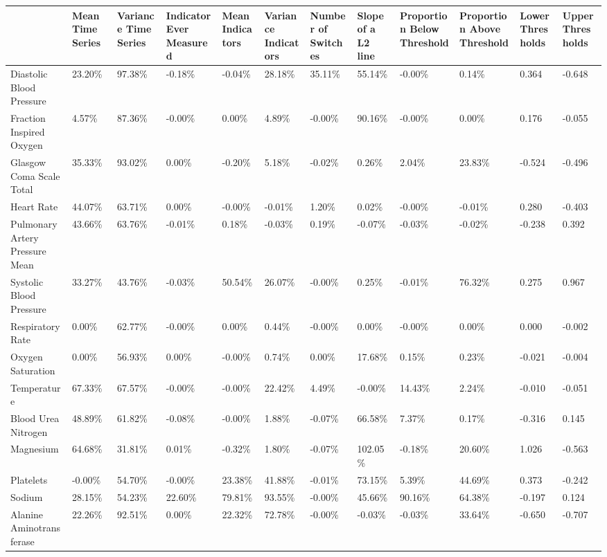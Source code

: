 \begin{tabular}{llllllllllll}
\toprule
 & Mean Time Series & Variance Time Series & Indicator Ever Measured & Mean Indicators & Variance Indicators & Number of Switches & Slope of a L2 line & Proportion Below Threshold & Proportion Above Threshold & Lower Thresholds & Upper Thresholds \\
\midrule
Diastolic Blood Pressure & 23.20\% & 97.38\% & -0.18\% & -0.04\% & 28.18\% & 35.11\% & 55.14\% & -0.00\% & 0.14\% & 0.364 & -0.648 \\
Fraction Inspired Oxygen & 4.57\% & 87.36\% & -0.00\% & 0.00\% & 4.89\% & -0.00\% & 90.16\% & -0.00\% & 0.00\% & 0.176 & -0.055 \\
Glasgow Coma Scale Total & 35.33\% & 93.02\% & 0.00\% & -0.20\% & 5.18\% & -0.02\% & 0.26\% & 2.04\% & 23.83\% & -0.524 & -0.496 \\
Heart Rate & 44.07\% & 63.71\% & 0.00\% & -0.00\% & -0.01\% & 1.20\% & 0.02\% & -0.00\% & -0.01\% & 0.280 & -0.403 \\
Pulmonary Artery Pressure Mean & 43.66\% & 63.76\% & -0.01\% & 0.18\% & -0.03\% & 0.19\% & -0.07\% & -0.03\% & -0.02\% & -0.238 & 0.392 \\
Systolic Blood Pressure & 33.27\% & 43.76\% & -0.03\% & 50.54\% & 26.07\% & -0.00\% & 0.25\% & -0.01\% & 76.32\% & 0.275 & 0.967 \\
Respiratory Rate & 0.00\% & 62.77\% & -0.00\% & 0.00\% & 0.44\% & -0.00\% & 0.00\% & -0.00\% & 0.00\% & 0.000 & -0.002 \\
Oxygen Saturation & 0.00\% & 56.93\% & 0.00\% & -0.00\% & 0.74\% & 0.00\% & 17.68\% & 0.15\% & 0.23\% & -0.021 & -0.004 \\
Temperature & 67.33\% & 67.57\% & -0.00\% & -0.00\% & 22.42\% & 4.49\% & -0.00\% & 14.43\% & 2.24\% & -0.010 & -0.051 \\
Blood Urea Nitrogen & 48.89\% & 61.82\% & -0.08\% & -0.00\% & 1.88\% & -0.07\% & 66.58\% & 7.37\% & 0.17\% & -0.316 & 0.145 \\
Magnesium & 64.68\% & 31.81\% & 0.01\% & -0.32\% & 1.80\% & -0.07\% & 102.05\% & -0.18\% & 20.60\% & 1.026 & -0.563 \\
Platelets & -0.00\% & 54.70\% & -0.00\% & 23.38\% & 41.88\% & -0.01\% & 73.15\% & 5.39\% & 44.69\% & 0.373 & -0.242 \\
Sodium & 28.15\% & 54.23\% & 22.60\% & 79.81\% & 93.55\% & -0.00\% & 45.66\% & 90.16\% & 64.38\% & -0.197 & 0.124 \\
Alanine Aminotransferase & 22.26\% & 92.51\% & 0.00\% & 22.32\% & 72.78\% & -0.00\% & -0.03\% & -0.03\% & 33.64\% & -0.650 & -0.707 \\

\end{tabular}
